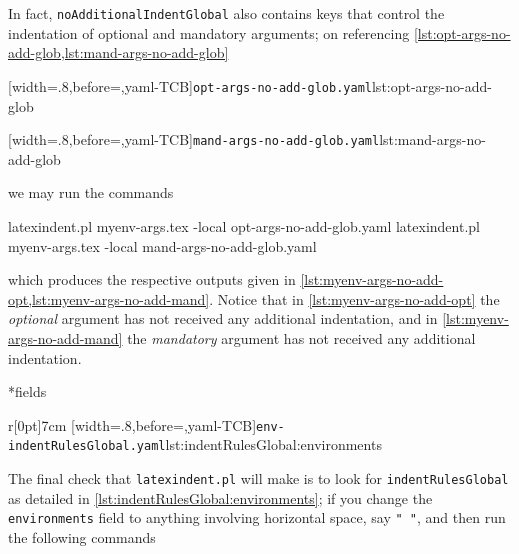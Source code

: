 In fact, \texttt{noAdditionalIndentGlobal} also contains keys that control the indentation of optional and mandatory
arguments; on referencing \cref{lst:opt-args-no-add-glob,lst:mand-args-no-add-glob}

\begin{minipage}{.49\textwidth}
[width=.8\linewidth,before=\centering,yaml-TCB]{\texttt{opt-args-no-add-glob.yaml}}{lst:opt-args-no-add-glob}
\end{minipage}
\hfill
\begin{minipage}{.49\textwidth}
[width=.8\linewidth,before=\centering,yaml-TCB]{\texttt{mand-args-no-add-glob.yaml}}{lst:mand-args-no-add-glob}
\end{minipage}

we may run the commands
\begin{commandshell}
latexindent.pl  myenv-args.tex -local opt-args-no-add-glob.yaml
latexindent.pl  myenv-args.tex -local mand-args-no-add-glob.yaml
\end{commandshell}
which produces the respective outputs given in \cref{lst:myenv-args-no-add-opt,lst:myenv-args-no-add-mand}. Notice that in \cref{lst:myenv-args-no-add-opt}
the \emph{optional} argument has not received any additional indentation, and in \cref{lst:myenv-args-no-add-mand} the \emph{mandatory} argument
has not received any additional indentation.

\begin{minipage}{.45\textwidth}
\end{minipage}
\hfill
\begin{minipage}{.45\textwidth}
\end{minipage}

*{fields}
\begin{wrapfigure}[4]{r}[0pt]{7cm}
[width=.8\linewidth,before=\centering,yaml-TCB]{\texttt{env-indentRulesGlobal.yaml}}{lst:indentRulesGlobal:environments}
\end{wrapfigure}
The final check that \texttt{latexindent.pl} will make is to look for \texttt{indentRulesGlobal} as detailed in \cref{lst:indentRulesGlobal:environments}; if you change the \texttt{environments}
field to anything involving horizontal space, say \lstinline!" "!, and then run the following commands

